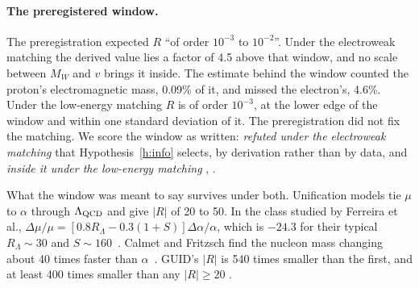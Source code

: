 \paragraph{The preregistered window.} The preregistration expected $R$ ``of order $10^{-3}$ to $10^{-2}$''. Under the electroweak matching the
derived value lies a factor of 4.5 above that window, and no scale between $M_W$ and $v$ brings it inside. The estimate behind the window
counted the proton's electromagnetic mass, 0.09\% of it, and missed the electron's, 4.6\%. Under the low-energy matching $R$ is of order
$10^{-3}$, at the lower edge of the window and within one standard deviation of it. The preregistration did not fix the matching. We score the
window as written: \emph{refuted under the electroweak matching} that Hypothesis~\ref{h:info} selects, by derivation rather than by data, and
\emph{inside it under the low-energy matching} , .

What the window was meant to say survives under both. Unification models tie $\mu$ to $\alpha$ through $\Lambda_{\rm QCD}$ and give $|R|$ of 20 to
50. In the class studied by Ferreira et al., $\Delta\mu/\mu=[0.8R_\Lambda-0.3(1+S)]\Delta\alpha/\alpha$, which is $-24.3$ for their typical
$R_\Lambda\sim30$ and $S\sim160$~\cite{ferreira2012}. Calmet and Fritzsch find the nucleon mass changing about 40 times faster than
$\alpha$~\cite{calmet2002}. GUID's $|R|$ is 540 times smaller than the first, and at least 400 times smaller than any $|R|\ge20$ .

